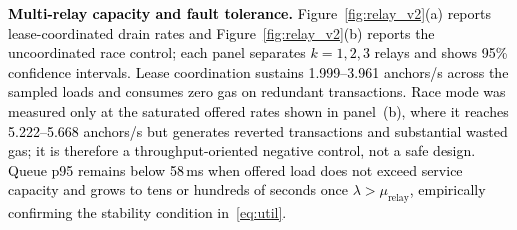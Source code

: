 \documentclass[final,5p,times,twocolumn]{elsarticle}
\begin{document}
\textcolor{black}{\textbf{Multi-relay capacity and fault tolerance.} Figure~\ref{fig:relay_v2}(a) reports lease-coordinated drain rates and Figure~\ref{fig:relay_v2}(b) reports the uncoordinated race control; each panel separates $k=1,2,3$ relays and shows 95\% confidence intervals. Lease coordination sustains 1.999--3.961 anchors/s across the sampled loads and consumes zero gas on redundant transactions. Race mode was measured only at the saturated offered rates shown in panel~(b), where it reaches 5.222--5.668 anchors/s but generates reverted transactions and substantial wasted gas; it is therefore a throughput-oriented negative control, not a safe design. Queue p95 remains below 58\,ms when offered load does not exceed service capacity and grows to tens or hundreds of seconds once $\lambda>\mu_{\mathrm{relay}}$, empirically confirming the stability condition in~\eqref{eq:util}.}
\end{document}
